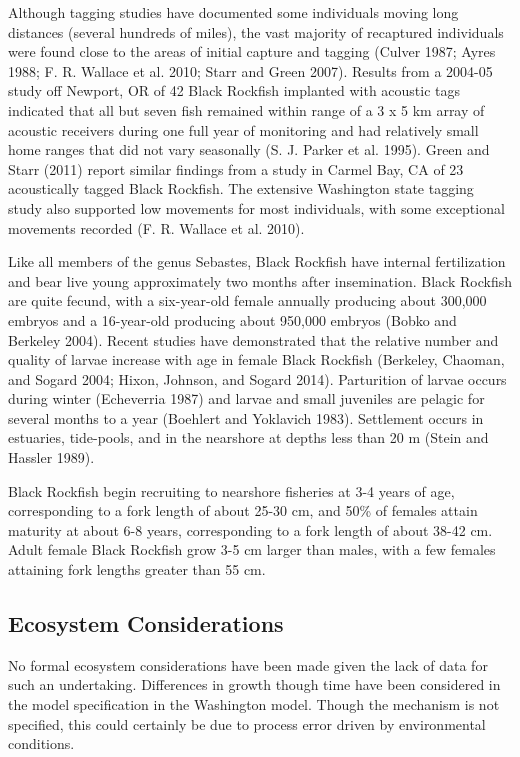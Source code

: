 \documentclass[11pt,
  english,
  letterpaper,
]{article}
\begin{document}
Although tagging studies have documented some individuals moving long distances (several hundreds of miles), the vast majority of recaptured individuals were found close to the areas of initial capture and tagging (Culver 1987; Ayres 1988; F. R. Wallace et al. 2010; Starr and Green 2007). Results from a 2004-05 study off Newport, OR of 42 Black Rockfish implanted with acoustic tags indicated that all but seven fish remained within range of a 3 x 5 km array of acoustic receivers during one full year of monitoring and had relatively small home ranges that did not vary seasonally (S. J. Parker et al. 1995). Green and Starr (2011) report similar findings from a study in Carmel Bay, CA of 23 acoustically tagged Black Rockfish. The extensive Washington state tagging study also supported low movements for most individuals, with some exceptional movements recorded (F. R. Wallace et al. 2010).

Like all members of the genus Sebastes, Black Rockfish have internal fertilization and bear live young approximately two months after insemination. Black Rockfish are quite fecund, with a six-year-old female annually producing about 300,000 embryos and a 16-year-old producing about 950,000 embryos (Bobko and Berkeley 2004). Recent studies have demonstrated that the relative number and quality of larvae increase with age in female Black Rockfish (Berkeley, Chaoman, and Sogard 2004; Hixon, Johnson, and Sogard 2014). Parturition of larvae occurs during winter (Echeverria 1987) and larvae and small juveniles are pelagic for several months to a year (Boehlert and Yoklavich 1983). Settlement occurs in estuaries, tide-pools, and in the nearshore at depths less than 20 m (Stein and Hassler 1989).

Black Rockfish begin recruiting to nearshore fisheries at 3-4 years of age, corresponding to a fork length of about 25-30 cm, and 50\% of females attain maturity at about 6-8 years, corresponding to a fork length of about 38-42 cm. Adult female Black Rockfish grow 3-5 cm larger than males, with a few females attaining fork lengths greater than 55 cm.

\hypertarget{ecosystem-considerations-1}{%
\subsection{Ecosystem Considerations}\label{ecosystem-considerations-1}}

No formal ecosystem considerations have been made given the lack of data for such an undertaking. Differences in growth though time have been considered in the model specification in the Washington model. Though the mechanism is not specified, this could certainly be due to process error driven by environmental conditions.
\end{document}
